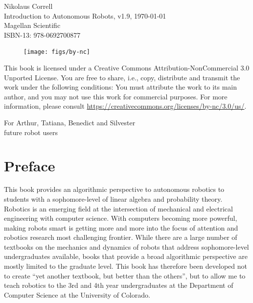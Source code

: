 \documentclass[paper=6.14in:9.21in,pagesize=pdftex,11pt,twoside,openright]{scrbook}
\begin{document}

\thispagestyle{empty}
\begin{flushleft}
Nikolaus Correll\\
Introduction to Autonomous Robots, v1.9, \today\\
Magellan Scientific\\
ISBN-13: 978-0692700877
\end{flushleft}

\vfill

\begin{figure}[!h]
\texttt{[image: figs/by-nc]}
\end{figure}

This book is licensed under a Creative Commons Attribution-NonCommercial 3.0 Unported License. You are free to share, i.e., copy, distribute and transmit the work under the following conditions: You must attribute the work to its main author, and you may not use this work for commercial purposes. For more information, please consult \url{https://creativecommons.org/licenses/by-nc/3.0/us/}.


\cleardoublepage
\thispagestyle{empty}
\vspace*{\fill}
\begin{center}
For Arthur, Tatiana, Benedict and Silvester\\
future robot users
\end{center}
\vspace*{\fill}

\tableofcontents

\chapter*{Preface}
This book provides an algorithmic perspective to autonomous robotics to students with a sophomore-level of linear algebra and probability theory. Robotics is an emerging field at the intersection of mechanical and electrical engineering with computer science. With computers becoming more powerful, making robots smart is getting more and more into the focus of attention and robotics research most challenging frontier. While there are a large number of textbooks on the mechanics and dynamics of robots that address sophomore-level undergraduates available, books that provide a broad algorithmic perspective are mostly limited to the graduate level. This book has therefore been developed not to create ``yet another textbook, but better than the others'', but to allow me to teach robotics to the 3rd and 4th year undergraduates at the Department of Computer Science at the University of Colorado. 
\end{document}
